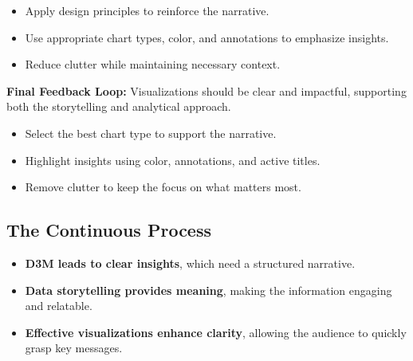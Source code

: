 \documentclass[
  11pt,
]{article}
\providecommand{\tightlist}{%
  \setlength{\itemsep}{0pt}\setlength{\parskip}{0pt}}
\begin{document}
\begin{itemize}
\tightlist
\item
  Apply design principles to reinforce the narrative.
\item
  Use appropriate chart types, color, and annotations to emphasize
  insights.
\item
  Reduce clutter while maintaining necessary context.
\end{itemize}

\textbf{Final Feedback Loop:} Visualizations should be clear and
impactful, supporting both the storytelling and analytical approach.

\begin{itemize}
\tightlist
\item
  Select the best chart type to support the narrative.
\item
  Highlight insights using color, annotations, and active titles.
\item
  Remove clutter to keep the focus on what matters most.
\end{itemize}

\subsection{\texorpdfstring{\textbf{The Continuous
Process}}{The Continuous Process}}\label{the-continuous-process}

\begin{itemize}
\tightlist
\item
  \textbf{D3M leads to clear insights}, which need a structured
  narrative.
\item
  \textbf{Data storytelling provides meaning}, making the information
  engaging and relatable.
\item
  \textbf{Effective visualizations enhance clarity}, allowing the
  audience to quickly grasp key messages.
\end{itemize}
\end{document}
